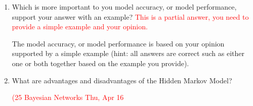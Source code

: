\documentclass[12pt]{article}
\newenvironment{QandA}{\begin{enumerate}[label=\bfseries\arabic*.]\bfseries}
{\end{enumerate}}
\newenvironment{answered}{\par\normalfont\color{Sepia}}{}
\begin{document}
\begin{QandA}
    \item Which is more important to you \textemdash{} model accuracy, or model
    performance, support your answer with an example? \textcolor{red}{This is a
    partial answer, you need to provide a simple example and your
    opinion.}
    \begin{answered}
        The model accuracy, or model performance is based on your
        opinion supported by a simple example (hint: all answers are
        correct such as either one or both together based on the
        example you provide).
    \end{answered}

    \item What are advantages and disadvantages of the Hidden Markov Model?
    \begin{answered}
        \textcolor{red}{(25 Bayesian Networks \textemdash{} Thu, Apr 16}
    \end{answered}
\end{QandA}
\end{document}
